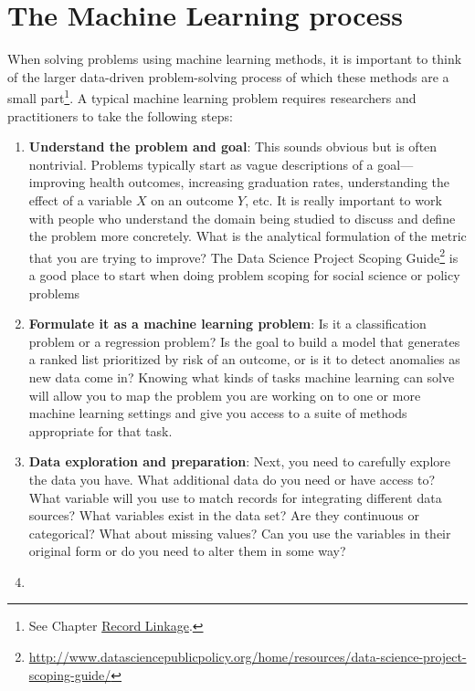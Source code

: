 \documentclass[]{krantz}
\begin{document}
\section{The Machine Learning
process}\label{the-machine-learning-process}

When solving problems using machine learning methods, it is important to
think of the larger data-driven problem-solving process of which these
methods are a small part\footnote{See Chapter
  \protect\hyperlink{chap:link}{Record Linkage}.}. A typical machine
learning problem requires researchers and practitioners to take the
following steps:

\begin{enumerate}
\def\labelenumi{\arabic{enumi}.}
\item
  \textbf{Understand the problem and goal}: This sounds obvious but is
  often nontrivial. Problems typically start as vague descriptions of a
  goal---improving health outcomes, increasing graduation rates,
  understanding the effect of a variable \(X\) on an outcome \(Y\), etc.
  It is really important to work with people who understand the domain
  being studied to discuss and define the problem more concretely. What
  is the analytical formulation of the metric that you are trying to
  improve? The Data Science Project Scoping Guide\footnote{\url{http://www.datasciencepublicpolicy.org/home/resources/data-science-project-scoping-guide/}}
  is a good place to start when doing problem scoping for social science
  or policy problems
\item
  \textbf{Formulate it as a machine learning problem}: Is it a
  classification problem or a regression problem? Is the goal to build a
  model that generates a ranked list prioritized by risk of an outcome,
  or is it to detect anomalies as new data come in? Knowing what kinds
  of tasks machine learning can solve will allow you to map the problem
  you are working on to one or more machine learning settings and give
  you access to a suite of methods appropriate for that task.
\item
  \textbf{Data exploration and preparation}: Next, you need to carefully
  explore the data you have. What additional data do you need or have
  access to? What variable will you use to match records for integrating
  different data sources? What variables exist in the data set? Are they
  continuous or categorical? What about missing values? Can you use the
  variables in their original form or do you need to alter them in some
  way?
\item

\end{enumerate}
\end{document}
